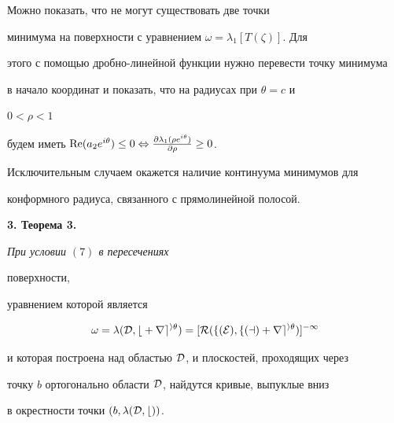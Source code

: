  


\begin{notenonum} 


Можно показать, что не могут существовать две точки 


минимума на поверхности с уравнением $\omega=\lambda_1[T(\zeta)]$. Для 


этого с помощью дробно-линейной функции нужно перевести точку минимума 


в начало координат и показать, что на радиусах при $\theta=c$ и 


$0<\rho<1$ 


будем иметь $\re(a_2e^{i\theta})\le0\Leftrightarrow 


\frac{\partial\lambda_1(\rho e^{i\theta})}{\partial\rho}\ge0$. 


Исключительным случаем окажется наличие континуума минимумов для 


конформного радиуса, связанного с прямолинейной полосой. 


\end{notenonum} 


 


{\bf 3. Теорема 3.} {\it При условии $(7)$ в пересечениях 


поверхности, 


уравнением которой является 


$$ 


\omega=\lambda(\cal D,b+r e^{i\theta})=[R(f(E),f(a)+ 


r e^{i\theta})]^{-1} 


$$ 


и которая построена над областью $\cal D$, и плоскостей, проходящих через 


точку $b$ ортогонально области $\cal D$, найдутся кривые, выпуклые вниз 


в окрестности точки $(b,\lambda(\cal D,b))$.} 


 


